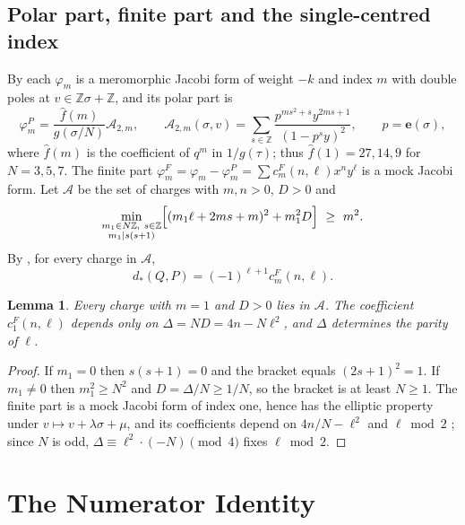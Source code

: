 \documentclass[11pt]{amsart}
\numberwithin{equation}{section}
\theoremstyle{plain}
\newtheorem{lem}[thm]{Lemma}
\theoremstyle{remark}
\newcommand{\Z}{\mathbb{Z}}
\newcommand{\cA}{\mathcal{A}}
\newcommand{\e}{\mathbf{e}}
\begin{document}
\subsection{Polar part, finite part and the single-centred index}
By \cite[Theorem~5.2]{BSS25} each $\varphi_m$ is a meromorphic Jacobi form of weight $-k$ and index $m$ with double poles at $v\in\Z\sigma+\Z$, and its polar part is \cite[(5.45)]{BSS25}
\begin{equation}\label{eq:polar}
\varphi^P_m=\frac{\hat f(m)}{g(\sigma/N)}\cA_{2,m},\qquad \cA_{2,m}(\sigma,v)=\sum_{s\in\Z}\frac{p^{ms^2+s}y^{2ms+1}}{(1-p^sy)^2},\qquad p=\e(\sigma),
\end{equation}
where $\hat f(m)$ is the coefficient of $q^m$ in $1/g(\tau)$; thus $\hat f(1)=27,14,9$ for $N=3,5,7$. The finite part $\varphi^F_m=\varphi_m-\varphi^P_m=\sum c^F_m(n,\ell)x^ny^\ell$ is a mock Jacobi form. Let $\cA$ be the set of charges with $m,n>0$, $D>0$ and
\begin{equation}\label{eq:setA}
\min_{\substack{m_1\in N\Z,\ s\in\Z\\ m_1\mid s(s+1)}}\Bigl[(m_1\ell+2ms+m)^2+m_1^2D\Bigr]\ \ge\ m^2.
\end{equation}
By \cite[Theorem~5.4(a) and (5.57)]{BSS25}, for every charge in $\cA$,
\begin{equation}\label{eq:dstar}
d_*(Q,P)=(-1)^{\ell+1}c^F_m(n,\ell).
\end{equation}

\begin{lem}\label{lem:first}
Every charge with $m=1$ and $D>0$ lies in $\cA$. The coefficient $c^F_1(n,\ell)$ depends only on $\Delta=ND=4n-N\ell^2$, and $\Delta$ determines the parity of $\ell$.
\end{lem}

\begin{proof}
If $m_1=0$ then $s(s+1)=0$ and the bracket equals $(2s+1)^2=1$. If $m_1\ne0$ then $m_1^2\ge N^2$ and $D=\Delta/N\ge1/N$, so the bracket is at least $N\ge1$. The finite part is a mock Jacobi form of index one, hence has the elliptic property under $v\mapsto v+\lambda\sigma+\mu$, and its coefficients depend on $4n/N-\ell^2$ and $\ell\bmod2$ \cite[\S2]{EZ85}; since $N$ is odd, $\Delta\equiv\ell^2\cdot(-N)\pmod4$ fixes $\ell\bmod2$.
\end{proof}

\section{The Numerator Identity}\label{sec:num}
\end{document}
